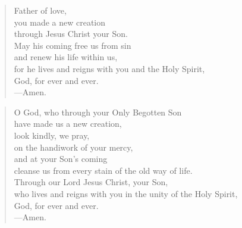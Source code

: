 \prayer

\setlength{\vleftmargin}{\prayerleftmargini}

\begin{verse}
Father of love,\\
you made a new creation\\
through Jesus Christ your Son.\\
May his coming free us from sin\\
and renew his life within us,\\
for he lives and reigns with you and the Holy Spirit,\\
God, for ever and ever.\\
{\color{red}---\thinspace}Amen.
\end{verse}


\begin{verse}
O God, who through your Only Begotten Son\\
have made us a new creation,\\
look kindly, we pray,\\
on the handiwork of your mercy,\\
and at your Son’s coming\\
cleanse us from every stain of the old way of life.\\
Through our Lord Jesus Christ, your Son,\\
 who lives and reigns with you in the unity of the Holy Spirit,\\
God, for ever and ever.\\
{\color{red}---\thinspace}Amen.
\end{verse}

\setlength{\vleftmargin}{\defleftmargini}